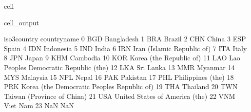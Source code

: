 \documentclass[letterpaper,10pt,english]{jupyterBook}
\begin{document}
\begin{sphinxuseclass}{cell}
\begin{sphinxVerbatimOutput}
\begin{sphinxuseclass}{cell_output}
\begin{sphinxVerbatim}[commandchars=\\\{\}]
   iso3\PYGZus{}country                                 country\PYGZus{}name  \PYGZbs{}
0           BGD                                   Bangladesh   
1           BRA                                       Brazil   
2           CHN                                        China   
3           ESP                                        Spain   
4           IDN                                    Indonesia   
5           IND                                        India   
6           IRN                   Iran (Islamic Republic of)   
7           ITA                                        Italy   
8           JPN                                        Japan   
9           KHM                                     Cambodia   
10          KOR                      Korea (the Republic of)   
11          LAO       Lao People\PYGZsq{}s Democratic Republic (the)   
12          LKA                                    Sri Lanka   
13          MMR                                      Myanmar   
14          MYS                                     Malaysia   
15          NPL                                        Nepal   
16          PAK                                     Pakistan   
17          PHL                            Philippines (the)   
18          PRK  Korea (the Democratic People\PYGZsq{}s Republic of)   
19          THA                                     Thailand   
20          TWN                   Taiwan (Province of China)   
21          USA               United States of America (the)   
22          VNM                                     Viet Nam   
23          NaN                                          NaN   


\end{sphinxVerbatim}
\end{sphinxuseclass}
\end{sphinxVerbatimOutput}
\end{sphinxuseclass}
\end{document}
